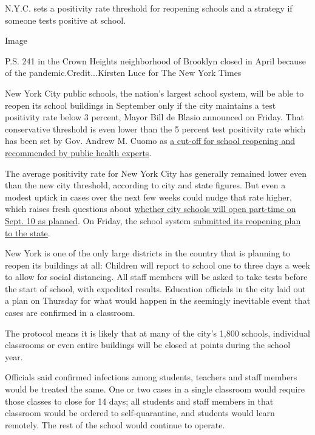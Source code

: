 N.Y.C. sets a positivity rate threshold for reopening schools and a
strategy if someone tests positive at school.

Image

P.S. 241 in the Crown Heights neighborhood of Brooklyn closed in April
because of the pandemic.Credit...Kirsten Luce for The New York Times

New York City public schools, the nation's largest school system, will
be able to reopen its school buildings in September only if the city
maintains a test positivity rate below 3 percent, Mayor Bill de Blasio
announced on Friday. That conservative threshold is even lower than the
5 percent test positivity rate which has been set by Gov. Andrew M.
Cuomo as
\href{https://www.nytimes3xbfgragh.onion/2020/07/14/us/coronavirus-schools-fall.html}{a
cut-off for school reopening and recommended by public health experts}.

The average positivity rate for New York City has generally remained
lower even than the new city threshold, according to city and state
figures. But even a modest uptick in cases over the next few weeks could
nudge that rate higher, which raises fresh questions about
\href{https://www.nytimes3xbfgragh.onion/2020/07/08/nyregion/nyc-schools-reopening-plan.html}{whether
city schools will open part-time on Sept. 10 as planned}. On Friday, the
school system
\href{https://infohub.nyced.org/docs/default-source/default-document-library/nyc-doe---state-doh-reopening-plan-7-31.pdf}{submitted
its reopening plan to the state}.

New York is one of the only large districts in the country that is
planning to reopen its buildings at all: Children will report to school
one to three days a week to allow for social distancing. All staff
members will be asked to take tests before the start of school, with
expedited results. Education officials in the city laid out a plan on
Thursday for what would happen in the seemingly inevitable event that
cases are confirmed in a classroom.

The protocol means it is likely that at many of the city's 1,800
schools, individual classrooms or even entire buildings will be closed
at points during the school year.

Officials said confirmed infections among students, teachers and staff
members would be treated the same. One or two cases in a single
classroom would require those classes to close for 14 days; all students
and staff members in that classroom would be ordered to self-quarantine,
and students would learn remotely. The rest of the school would continue
to operate.

